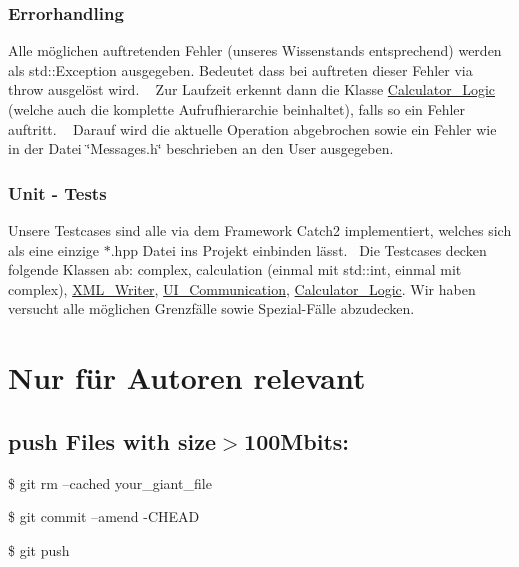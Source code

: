  \subsubsection*{Errorhandling}

Alle möglichen auftretenden Fehler (unseres Wissenstands entsprechend) werden als std\+::\+Exception ausgegeben. Bedeutet dass bei auftreten dieser Fehler via {\ttfamily throw} ausgelöst wird. ~\newline
 Zur Laufzeit erkennt dann die Klasse \mbox{\hyperlink{class_calculator___logic}{Calculator\+\_\+\+Logic}} (welche auch die komplette Aufrufhierarchie beinhaltet), falls so ein Fehler auftritt. ~\newline
 Darauf wird die aktuelle Operation abgebrochen sowie ein Fehler wie in der Datei \char`\"{}\+Messages.\+h\char`\"{} beschrieben an den User ausgegeben.

\subsubsection*{Unit -\/ Tests}

Unsere Testcases sind alle via dem Framework Catch2 implementiert, welches sich als eine einzige $\ast$.hpp Datei ins Projekt einbinden lässt.~\newline
 Die Testcases decken folgende Klassen ab\+: complex, calculation (einmal mit std\+::int, einmal mit complex), \mbox{\hyperlink{class_x_m_l___writer}{X\+M\+L\+\_\+\+Writer}}, \mbox{\hyperlink{class_u_i___communication}{U\+I\+\_\+\+Communication}}, \mbox{\hyperlink{class_calculator___logic}{Calculator\+\_\+\+Logic}}. Wir haben versucht alle möglichen Grenzfälle sowie Spezial-\/\+Fälle abzudecken.

\section*{Nur für Autoren relevant}

\subsection*{push Files with size$>$100\+Mbits\+:}


\begin{DoxyItemize}
\item \$ git rm --cached your\+\_\+giant\+\_\+file
\item \$ git commit --amend -\/\+C\+H\+E\+AD
\item \$ git push 
\end{DoxyItemize}
